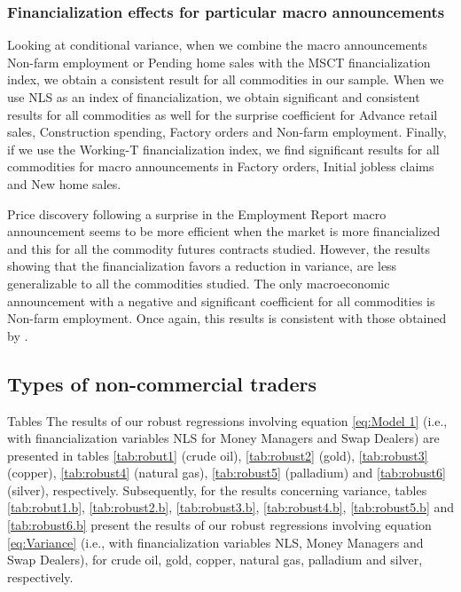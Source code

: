 \documentclass[12pt]{article}
\begin{document}
	
	\subsubsection{Financialization effects for particular macro announcements}
Looking at conditional variance, when we combine the macro  announcements Non-farm employment or Pending home sales with the MSCT financialization index, we obtain a consistent result for all commodities in our sample. When we use NLS as an index of financialization, we obtain significant and consistent results for all commodities as well for the surprise coefficient for Advance retail sales, Construction spending, Factory orders and Non-farm employment.
Finally, if we use the Working-T financialization index, we find significant results for all commodities for macro announcements in Factory orders, Initial jobless claims and New home sales.

 
Price discovery following a surprise in the Employment Report macro announcement seems to be more efficient when the market is more financialized and this for all the commodity futures contracts studied. However, the results showing that the financialization favors a reduction in variance, are less generalizable to all the commodities studied. The only macroeconomic announcement with a negative and significant coefficient for all commodities is Non-farm employment. Once again, this results is consistent with those obtained by \citet{hordahl2015expectations}.

\subsection{Types of non-commercial traders}
 Tables
The results of our robust regressions involving equation \ref{eq:Model 1} (i.e., with financialization variables NLS for Money Managers and Swap Dealers) are presented in tables  \ref{tab:robut1} (crude oil), \ref{tab:robust2} (gold), \ref{tab:robust3} (copper), \ref{tab:robust4} (natural gas), \ref{tab:robust5} (palladium) and \ref{tab:robust6} (silver), respectively.  
 Subsequently, for the results concerning  variance, tables \ref{tab:robut1.b}, \ref{tab:robust2.b}, \ref{tab:robust3.b}, \ref{tab:robust4.b}, \ref{tab:robust5.b} and \ref{tab:robust6.b} present the results of our robust regressions involving equation \ref{eq:Variance} (i.e., with financialization variables NLS, Money Managers and Swap Dealers), for crude oil, gold, copper, natural gas, palladium and silver, respectively.
 
\end{document}
